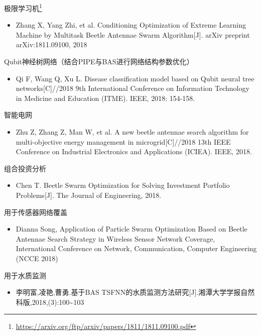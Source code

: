 \documentclass[]{ctexbook}
\providecommand{\tightlist}{%
  \setlength{\itemsep}{0pt}\setlength{\parskip}{0pt}}
\renewcommand{\href}[2]{#2\footnote{\url{#1}}}
\begin{document}
\href{https://arxiv.org/ftp/arxiv/papers/1811/1811.09100.pdf}{极限学习机}

\begin{itemize}
\tightlist
\item
  Zhang X, Yang Zhi, et al. Conditioning Optimization of Extreme
  Learning Machine by Multitask Beetle Antennae Swarm Algorithm{[}J{]}.
  arXiv preprint arXiv:1811.09100, 2018
\end{itemize}

Qubit神经树网络（结合PIPE与BAS进行网络结构参数优化）

\begin{itemize}
\tightlist
\item
  Qi F, Wang Q, Xu L. Disease classification model based on Qubit neural
  tree networks{[}C{]}//2018 9th International Conference on Information
  Technology in Medicine and Education (ITME). IEEE, 2018: 154-158.
\end{itemize}

智能电网

\begin{itemize}
\tightlist
\item
  Zhu Z, Zhang Z, Man W, et al. A new beetle antennae search algorithm
  for multi-objective energy management in microgrid{[}C{]}//2018 13th
  IEEE Conference on Industrial Electronics and Applications (ICIEA).
  IEEE, 2018.
\end{itemize}

组合投资分析

\begin{itemize}
\tightlist
\item
  Chen T. Beetle Swarm Optimization for Solving Investment Portfolio
  Problems{[}J{]}. The Journal of Engineering, 2018.
\end{itemize}

用于传感器网络覆盖

\begin{itemize}
\tightlist
\item
  Dianna Song, Application of Particle Swarm Optimization Based on
  Beetle Antennae Search Strategy in Wireless Sensor Network Coverage,
  International Conference on Network, Communication, Computer
  Engineering (NCCE 2018)
\end{itemize}

用于水质监测

\begin{itemize}
\tightlist
\item
  李明富,凌艳,曹勇.基于BAS
  TSFNN的水质监测方法研究{[}J{]}.湘潭大学学报自然科版,2018,(3):100\textasciitilde{}103
\end{itemize}
\end{document}
